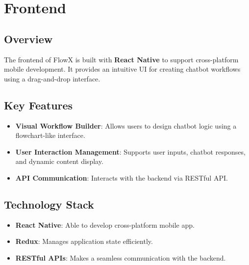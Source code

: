 \section{Frontend}

\subsection{Overview}
The frontend of FlowX is built with \textbf{React Native} to support cross-platform mobile development. It provides an intuitive UI for creating chatbot workflows using a drag-and-drop interface.

\subsection{Key Features}
\begin{itemize}
\item \textbf{Visual Workflow Builder}: Allows users to design chatbot logic using a flowchart-like interface.
\item \textbf{User Interaction Management}: Supports user inputs, chatbot responses, and dynamic content display.
\item \textbf{API Communication}: Interacts with the backend via RESTful API.
\end{itemize}

\subsection{Technology Stack}
\begin{itemize}
\item \textbf{React Native}: Able to develop cross-platform mobile app.
\item \textbf{Redux}: Manages application state efficiently.
\item \textbf{RESTful APIs}: Makes a seamless communication with the backend.
\end{itemize}